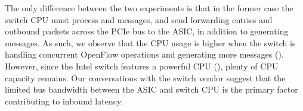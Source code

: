 The only difference between the two experiments is that in the former case
the switch CPU must process \flowmod and \packetout messages, and send
forwarding entries and outbound packets across the PCIe bus to the ASIC, in
addition to generating \packetin messages. As such, we observe that the CPU
usage is higher when the switch is handling concurrent OpenFlow operations and
generating more \packetin messages (). However, since
the Intel switch features a powerful CPU (), plenty of
CPU capacity remains. Our conversations with the switch vendor suggest that
the limited bus bandwidth between the ASIC and switch CPU is the primary
factor contributing to inbound latency. 

 
